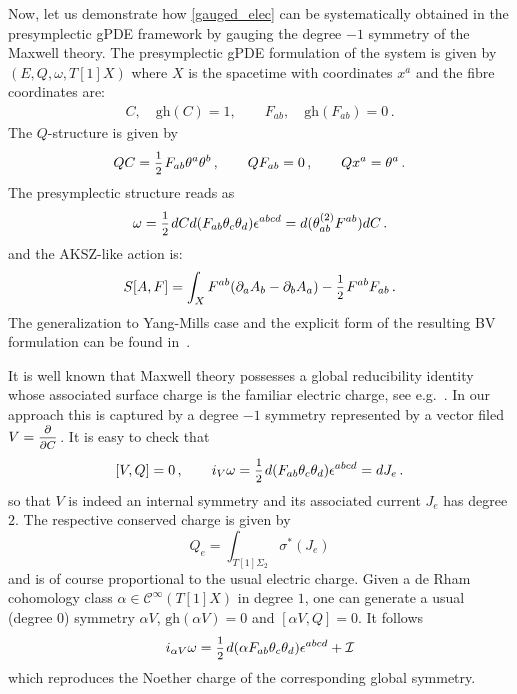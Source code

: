 \documentclass[a4paper,12pt]{article}
\numberwithin{equation}{section} %
\newcommand{\gh}[1]{\mathrm{gh}(#1)}
\renewcommand{\d}{\partial}
\newcommand{\half}{\mathchoice{%
    \ffrac{1}{2}}{\frac{1}{2}}{\frac{1}{2}}{\frac{1}{2}}}
\newcommand{\ffrac}[2]{\raisebox{.5pt}%
  {\footnotesize$\displaystyle\frac{#1}{#2}$}\kern1pt}
\newcommand{\ddl}[2]{\ffrac{\d #1}{\d #2}}
\newcommand{\cC}{\mathcal{C}}
\def\cI{\mathcal{I}}
\begin{document}
Now, let us demonstrate how \eqref{gauged_elec} can be systematically obtained  in the presymplectic gPDE framework by gauging the degree $-1$ symmetry of the Maxwell theory. The presymplectic gPDE formulation of the system is given by $(E,Q,\omega,T[1]X)$ where $X$ is the spacetime with coordinates $x^a$ and the fibre coordinates are:
\begin{equation}
\begin{gathered}
    C,\quad \gh{C} = 1, \qquad F_{ab}, \quad \gh{F_{ab}} = 0\,.
    \end{gathered}
\end{equation}
The $Q$-structure is given by
\begin{equation}
    QC = \half F_{ab}\theta^a \theta^b\,, \qquad QF_{ab} = 0\,, \qquad Qx^a=\theta^a\,.
\end{equation}
The presymplectic structure reads as
\begin{equation}
    \omega = \half dC d(F_{ab}\theta_c \theta_d) \epsilon^{abcd}=d(\theta^{(2)}_{ab} F^{ab})dC\,.
\end{equation}
and the AKSZ-like action is: 
\begin{equation}
    S[A,F] = \int_X F^{ab}(\partial_a A_b - \partial_b A_a) - \half F^{ab}F_{ab}\,.
\end{equation}
The generalization to Yang-Mills case and the explicit form of the resulting BV formulation can be found in~\cite{Grigoriev:2022zlq}.

It is well known that Maxwell theory possesses a global reducibility identity whose associated surface charge is the familiar electric charge, see e.g.~\cite{Barnich:2001jy}. In our approach this is captured by a degree $-1$ symmetry represented by a vector filed $V = \ddl{}{C}$. It is easy to check that
\begin{equation}
    [V,Q] = 0\,, \qquad 
    i_V \omega = \half d(F_{ab}\theta_c \theta_d)  \epsilon^{abcd} = d J_e\,.
\end{equation}
so that $V$ is indeed an internal symmetry and its associated current $J_e$ has degree $2$. The respective conserved charge is given by
\begin{equation}
    Q_e = \int_{T[1]\Sigma_2} \sigma^*(J_e) 
\end{equation}
and is of course proportional to the usual electric charge. Given a de Rham cohomology class $\alpha \in \cC^\infty(T[1]X)$ in degree $1$, one can generate a usual (degree $0$) symmetry $\alpha V$, $\gh{\alpha V} = 0$ and $[\alpha V, Q] = 0$. It follows
\begin{equation}
    i_{\alpha V} \omega = \half d(\alpha F_{ab}\theta_c \theta_d)\epsilon^{abcd} + \cI
\end{equation}
which reproduces the Noether charge of the corresponding global symmetry. 
\end{document}
